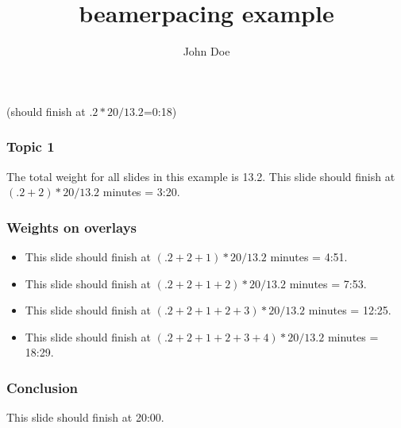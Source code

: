 \documentclass{beamer}
\title[Example]{beamerpacing example}
\author{John Doe}
\begin{document}
\begin{frame}
\titlepage
(should finish at $.2*20/13.2$=0:18)
\end{frame}


\begin{frame}
  \frametitle{Topic 1}
  The total weight for all slides in this example is 13.2.
  This slide should finish at $(.2+2)*20/13.2$ minutes = 3:20.
\end{frame}


\begin{frame}
  \frametitle{Weights on overlays}
  \begin{itemize}
  \item<1-> This slide should finish at $(.2+2+1)*20/13.2$ minutes = 4:51.
  \item<2-> This slide should finish at $(.2+2+1+2)*20/13.2$ minutes = 7:53.
  \item<3-> This slide should finish at $(.2+2+1+2+3)*20/13.2$ minutes = 12:25.
  \item<4-> This slide should finish at $(.2+2+1+2+3+4)*20/13.2$ minutes = 18:29.
  \end{itemize}
\end{frame}


\begin{frame}
  \frametitle{Conclusion}
  This slide should finish at 20:00.
\end{frame}
\end{document}
